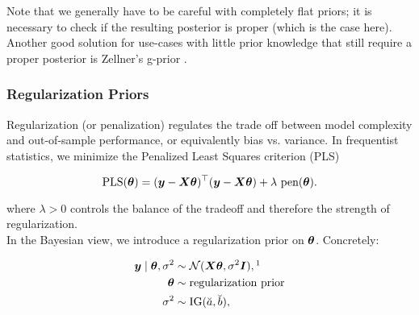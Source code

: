 
Note that we generally have to be careful with completely flat priors; it is necessary to check if the resulting posterior is proper (which is the case here).\\

Another good solution for use-cases with little prior knowledge that still require a proper posterior is Zellner's g-prior \citep{zellner_assessing_1986}.

\subsubsection*{Regularization Priors}

Regularization (or penalization) regulates the trade off between model complexity and out-of-sample performance, or equivalently bias vs. variance. 
In frequentist statistics, we minimize the Penalized Least Squares criterion (PLS) 

\begin{equation*}
    \text{PLS}(\btheta) = (\by - \bX \btheta)^\top (\by - \bX \btheta) + \lambda \ \text{pen}(\btheta).
\end{equation*}

where $\lambda > 0$ controls the balance of the tradeoff and therefore the strength of regularization.\\

In the Bayesian view, we introduce a regularization prior on $\bm{\theta}$.
Concretely:

\begin{equation}
    \begin{aligned}
        \by \mid \btheta, \ssd &\sim \Ncal(\bX \btheta, \ssd \bI),\footnotemark \\
        \btheta &\sim \text{regularization prior}\\
        \ssd &\sim \IG(\apri, \bpri),
    \end{aligned}
\end{equation}



